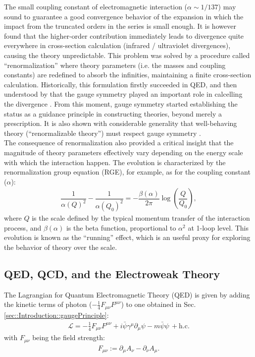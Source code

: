 The small coupling constant of electromagnetic interaction ($\alpha \sim 1/137$) may sound to guarantee a good convergence behavior of the expansion in which the impact from the truncated orders in the series is small enough. It is however found that the higher-order contribution immediately leads to divergence quite everywhere in cross-section calculation (infrared / ultraviolet divergences), causing the theory unpredictable. This problem was solved by a procedure called ``renormalization'' 
where theory parameters (i.e. the masses and coupling constants) are redefined to absorb the infinities, maintaining a finite cross-section calculation. 
Historically, this formulation firstly succeeded in QED, and then understood by that the gauge symmetry played an important role in calcelling the divergence \cite{Ward1950,Takahashi1957}. From this moment, gauge symmetry started establishing the status as a guidance principle in constructing theories, beyond merely a prescription. It is also shown with considerable generality that well-behaving theory (``renormalizable theory'') must respect gauge symmetry \cite{tHooft1972}. \\

The consequence of renormalization also provided a critical insight that the magnitude of theory parameters effectively vary depending on the energy scale with which the interaction happen. The evolution is characterized by the renormalization group equation (RGE), for example, as for the coupling constant ($\alpha$): 
\begin{align}
\dfrac{1}{\alpha(Q)^2}-\dfrac{1}{\alpha(Q_0)^2} = -\dfrac{\beta(\alpha)}{2\pi} \log{\left(\dfrac{Q}{Q_0}\right)},
\end{align}
where $Q$ is the scale defined by the typical momentum transfer of the interaction process, and $\beta(\alpha)$ is the beta function, proportional to $\alpha^2$ at 1-loop level. This evolution is known as the ``running'' effect, which is an useful proxy for exploring the behavior of theory over the scale. \\


\subsection{QED, QCD, and the Electroweak Theory}
The Lagrangian for Quantum Electromagnetic Theory (QED) is given by adding the kinetic terms of photon ($-\frac{1}{4}F_{\mu\nu} F^{\mu\nu}$) to one obtained in Sec. \ref{sec::Introduction::gaugePrinciple}:
\begin{align}
\mathcal{L} = -\frac{1}{4}F_{\mu\nu} F^{\mu\nu} + i \bar{\psi} \gamma^\mu \partial_\mu \psi - m \bar{\psi}\psi \, + \mathrm{h.c.}
\end{align}
with $F_{\mu\nu}$ being the field strength:
\begin{align}
F_{\mu\nu} := \partial_\mu A_\nu - \partial_\nu A_\mu.
\end{align}



